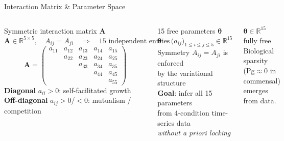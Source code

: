 \documentclass[aspectratio=169,10pt]{beamer}
\newcommand{\btheta}{\boldsymbol{\theta}}
\begin{document}
\begin{frame}[t]{Interaction Matrix \& Parameter Space}
  \small
  \begin{columns}[T]
      \begin{block}{Symmetric interaction matrix $\mathbf{A}$}
        \[
          \mathbf{A}\in\mathbb{R}^{5\times5},\quad A_{ij}=A_{ji}
          \quad\Rightarrow\quad 15 \text{ independent entries}
        \]
        \vspace{2pt}
        \[
          \mathbf{A}=\begin{pmatrix}
            a_{11} & a_{12} & a_{13} & a_{14} & a_{15}\\
                   & a_{22} & a_{23} & a_{24} & a_{25}\\
                   &        & a_{33} & a_{34} & a_{35}\\
                   &        &        & a_{44} & a_{45}\\
                   &        &        &        & a_{55}
          \end{pmatrix}
        \]
        \vspace{2pt}
        \textbf{Diagonal} $a_{ii}>0$: self-facilitated growth\\
        \textbf{Off-diagonal} $a_{ij}>0$/$<0$: mutualism / competition
      \end{block}
      \begin{block}{15 free parameters $\btheta$}
        \[
          \btheta = \bigl(a_{ij}\bigr)_{1\le i\le j\le 5}\in\mathbb{R}^{15}
        \]
        \vspace{2pt}
        Symmetry $A_{ij}=A_{ji}$ is enforced\\
        by the variational structure\\[6pt]
        \textbf{Goal}: infer all 15 parameters\\
        from 4-condition time-series data\\
        \emph{without a priori locking}
      \end{block}
      \vspace{4pt}
      \begin{alertblock}{$\btheta\in\mathbb{R}^{15}$ fully free}
        Biological sparsity (Pg$\approx$0 in\\
        commensal) emerges from data.
      \end{alertblock}
  \end{columns}
\end{frame}
\end{document}
